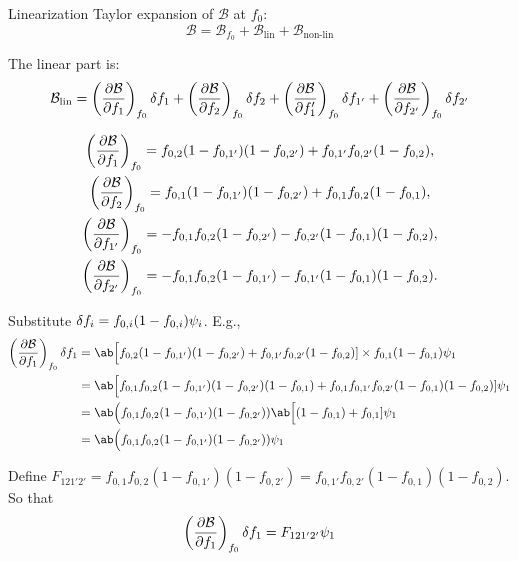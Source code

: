 \begin{frame}{Linearization}
  Taylor expansion of \(\mathcal{B}\) at \(f_0\):
  \begin{equation}
    \mathcal{B} = \mathcal{B}_{f_0} + \mathcal{B}_{\textrm{lin}} + \mathcal{B}_{\textrm{non-lin}}
  \end{equation}

  The linear part is:
  \begin{align}
    \mathcal{B}_{\textrm{lin}} = \pdv{\mathcal{B}}{f_1}_{f_0} \fdif{f_1} + \pdv{\mathcal{B}}{f_2}_{f_0} \fdif{f_2}
    + \pdv{\mathcal{B}}{f_1'}_{f_0} \fdif{f_{1'}} + \pdv{\mathcal{B}}{f_{2'}}_{f_0} \fdif{f_{2'}}
  \end{align}
\end{frame}

\begin{frame}
  \begin{gather}
    \pdv{\mathcal{B}}{f_1}_{f_0} = f_{0, 2}(1 - f_{0, 1'})(1 - f_{0, 2'}) + f_{0, 1'}f_{0, 2'}(1 - f_{0, 2}), \\
    \pdv{\mathcal{B}}{f_2}_{f_0} = f_{0, 1}(1 - f_{0, 1'})(1 - f_{0, 2'}) + f_{0, 1}f_{0, 2}(1 - f_{0, 1}), \\
    \pdv{\mathcal{B}}{f_{1'}}_{f_0} = - f_{0, 1}f_{0, 2}(1 - f_{0, 2'}) - f_{0, 2'}(1 - f_{0, 1})(1 - f_{0, 2}), \\
    \pdv{\mathcal{B}}{f_{2'}}_{f_0} = - f_{0, 1}f_{0, 2}(1 - f_{0, 1'}) - f_{0, 1'}(1 - f_{0, 1})(1 - f_{0, 2}).
  \end{gather}
\end{frame}

\begin{frame}
  Substitute \(\fdif{f_i} = f_{0, i}(1 - f_{0, i})\psi_i\). E.g.,
  \begin{align}
    \pdv{\mathcal{B}}{f_1}_{f_0} \fdif{f_1}
     & = \ab\Big[f_{0, 2}(1 - f_{0, 1'})(1 - f_{0, 2'}) + f_{0, 1'}f_{0, 2'}(1 - f_{0, 2})] \times f_{0, 1}(1 - f_{0, 1})\psi_1 \\
     & = \ab\Big[f_{0, 1}f_{0, 2}(1 - f_{0, 1'})(1 - f_{0, 2'})(1 - f_{0, 1})
    + f_{0, 1}f_{0, 1'}f_{0, 2'}(1 - f_{0, 1})(1 - f_{0, 2})]\psi_1 \nonumber                                                   \\
     & = \ab\Big(f_{0, 1}f_{0, 2}(1 - f_{0, 1'})(1 - f_{0, 2'}))\ab\Big[(1 - f_{0, 1}) + f_{0, 1}]\psi_1                        \\
     & = \ab\Big(f_{0, 1}f_{0, 2}(1 - f_{0, 1'})(1 - f_{0, 2'}))\psi_1
  \end{align}

  Define \(F_{121'2'} = f_{0, 1}f_{0, 2}(1 - f_{0, 1'})(1 - f_{0, 2'}) = f_{0, 1'}f_{0, 2'}(1 - f_{0, 1})(1 - f_{0, 2})\). So that
  \begin{equation}
    \pdv{\mathcal{B}}{f_1}_{f_0} \fdif{f_1} = F_{121'2'}\psi_1
  \end{equation}
\end{frame}

